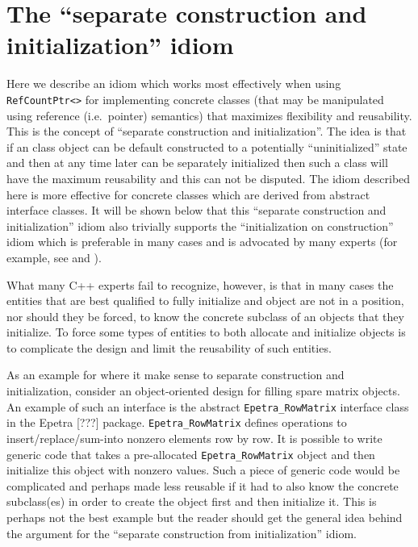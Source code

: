 %
\section{The ``separate construction and initialization'' idiom}
\label{rcp:apdx:sep-construct-init}
%

Here we describe an idiom which works most effectively when using
{}\texttt{RefCountPtr<>} for implementing concrete classes (that may
be manipulated using reference (i.e.~pointer) semantics) that
maximizes flexibility and reusability.  This is the concept of
``separate construction and initialization''.  The idea is that if an
class object can be default constructed to a potentially
``uninitialized'' state and then at any time later can be separately
initialized then such a class will have the maximum reusability and
this can not be disputed.  The idiom described here is more effective
for concrete classes which are derived from abstract interface
classes.  It will be shown below that this ``separate construction and
initialization'' idiom also trivially supports the ``initialization
on construction'' idiom which is preferable in many cases and is
advocated by many experts (for example, see {}\cite[Section
10.2.3]{ref:stroustrup_2000} and {}\cite[Item 4]{ref:meyers_1996}).

What many C++ experts fail to recognize, however, is that in many
cases the entities that are best qualified to fully initialize and
object are not in a position, nor should they be forced, to know the
concrete subclass of an objects that they initialize.  To force some
types of entities to both allocate and initialize objects is to complicate the
design and limit the reusability of such entities.

As an example for where it make sense to separate construction and
initialization, consider an object-oriented design for filling spare
matrix objects.  An example of such an interface is the abstract
{}\texttt{Epetra\_\-Row\-Matrix} interface class in the Epetra [???]
package.  {}\texttt{Epetra\_\-Row\-Matrix} defines operations to
insert/replace/sum-into nonzero elements row by row.  It is possible to
write generic code that takes a pre-allocated
{}\texttt{Epetra\_\-Row\-Matrix} object and then initialize this object
with nonzero values.  Such a piece of generic code would be
complicated and perhaps made less reusable if it had to also know the
concrete subclass(es) in order to create the object first and then
initialize it.  This is perhaps not the best example but the reader
should get the general idea behind the argument for the ``separate
construction from initialization'' idiom.

